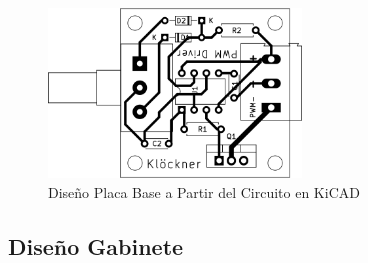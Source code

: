 \documentclass[
]{article}
\begin{document}
\begin{figure}
\centering
\includegraphics[width=0.6\textwidth,height=\textheight]{./pcb.png}
\caption{Diseño Placa Base a Partir del Circuito en KiCAD}
\end{figure}

\hypertarget{diseuxf1o-gabinete}{%
\subsection{Diseño Gabinete}\label{diseuxf1o-gabinete}}
\end{document}
